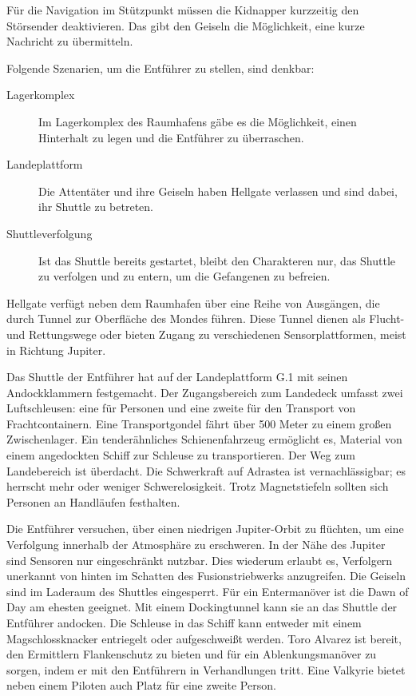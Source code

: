 Für die Navigation im Stützpunkt müssen die Kidnapper kurzzeitig den Störsender deaktivieren. Das gibt den Geiseln die Möglichkeit, eine kurze Nachricht zu übermitteln.

Folgende Szenarien, um die Entführer zu stellen, sind denkbar:

\begin{description}
	\item [Lagerkomplex] Im Lagerkomplex des Raumhafens gäbe es die Möglichkeit, einen Hinterhalt zu legen und die Entführer zu 
		überraschen. 
	\item [Landeplattform] Die Attentäter und ihre Geiseln haben Hellgate verlassen und sind dabei, ihr Shuttle zu betreten.
	\item [Shuttleverfolgung] Ist das Shuttle bereits gestartet, bleibt den Charakteren nur, das Shuttle zu verfolgen und zu entern, um die 
		Gefangenen zu befreien.
\end{description}



Hellgate verfügt neben dem Raumhafen über eine Reihe von Ausgängen, die durch Tunnel zur Oberfläche des Mondes führen. Diese Tunnel dienen als Flucht- und Rettungswege oder bieten Zugang zu verschiedenen Sensorplattformen, meist in Richtung Jupiter.

Das Shuttle der Entführer hat auf der Landeplattform G.1 mit seinen Andockklammern festgemacht. Der Zugangsbereich zum Landedeck umfasst zwei Luftschleusen: eine für Personen und eine zweite für den Transport von Frachtcontainern. Eine Transportgondel fährt über 500 Meter zu einem großen Zwischenlager. Ein tenderähnliches Schienenfahrzeug ermöglicht es, Material von einem angedockten Schiff zur Schleuse zu transportieren. Der Weg zum Landebereich ist überdacht. Die Schwerkraft auf Adrastea ist vernachlässigbar; es herrscht mehr oder weniger Schwerelosigkeit. Trotz Magnetstiefeln sollten sich Personen an Handläufen festhalten.


Die Entführer versuchen, über einen niedrigen Jupiter-Orbit zu flüchten, um eine Verfolgung innerhalb der Atmosphäre zu erschweren. In der Nähe des Jupiter sind Sensoren nur eingeschränkt nutzbar. Dies wiederum erlaubt es, Verfolgern unerkannt von hinten im Schatten des Fusionstriebwerks anzugreifen. Die Geiseln sind im Laderaum des Shuttles eingesperrt. Für ein Entermanöver ist die Dawn of Day am ehesten geeignet. Mit einem Dockingtunnel kann sie an das Shuttle der Entführer andocken. Die Schleuse in das Schiff kann entweder mit einem Magschlossknacker entriegelt oder aufgeschweißt werden. Toro Alvarez ist bereit, den Ermittlern Flankenschutz zu bieten und für ein Ablenkungsmanöver zu sorgen, indem er mit den Entführern in Verhandlungen tritt. Eine Valkyrie bietet neben einem Piloten auch Platz für eine zweite Person.

